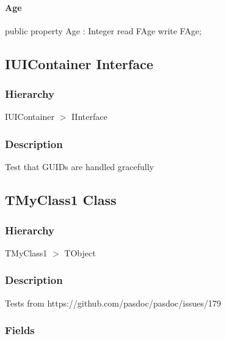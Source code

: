 \documentclass{report}
\begin{document}
\paragraph*{Age}\hspace*{\fill}

\begin{list}{}{
\setlength{\itemindent}{0cm}
\setlength{\listparindent}{0cm}
\setlength{\leftmargin}{\evensidemargin}
\addtolength{\leftmargin}{\tmplength}
\settowidth{\labelsep}{X}
\addtolength{\leftmargin}{\labelsep}
\setlength{\labelwidth}{\tmplength}
}
\begin{flushleft}
\item[\textbf{Declaration}\hfill]
\begin{ttfamily}
public property Age : Integer read FAge write FAge;\end{ttfamily}


\end{flushleft}
\end{list}
\subsection*{IUIContainer Interface}
\subsubsection*{\large{\textbf{Hierarchy}}\normalsize\hspace{1ex}\hfill}
IUIContainer {$>$} IInterface
\subsubsection*{\large{\textbf{Description}}\normalsize\hspace{1ex}\hfill}
Test that GUIDs are handled gracefully\subsection*{TMyClass1 Class}
\subsubsection*{\large{\textbf{Hierarchy}}\normalsize\hspace{1ex}\hfill}
TMyClass1 {$>$} TObject
\subsubsection*{\large{\textbf{Description}}\normalsize\hspace{1ex}\hfill}
Tests from https://github.com/pasdoc/pasdoc/issues/179\subsubsection*{\large{\textbf{Fields}}\normalsize\hspace{1ex}\hfill}
\end{document}
